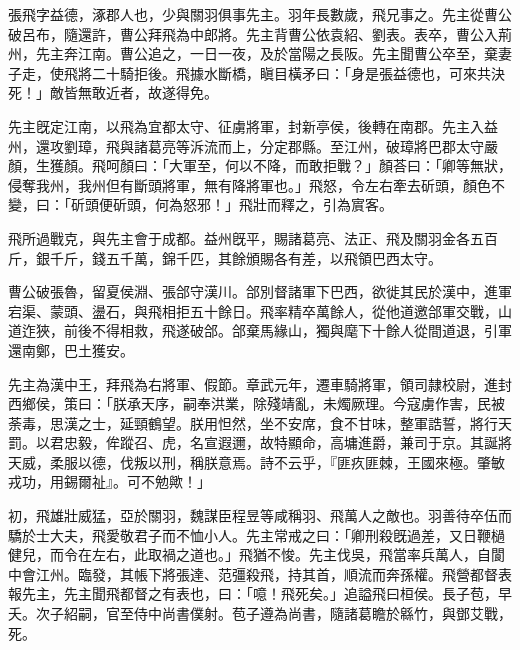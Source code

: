 \begin{pinyinscope}
 
 
 張飛字益德，涿郡人也，少與關羽俱事先主。羽年長數歲，飛兄事之。先主從曹公破呂布，隨還許，曹公拜飛為中郎將。先主背曹公依袁紹、劉表。表卒，曹公入荊州，先主奔江南。曹公追之，一日一夜，及於當陽之長阪。先主聞曹公卒至，棄妻子走，使飛將二十騎拒後。飛據水斷橋，瞋目橫矛曰：「身是張益德也，可來共決死！」敵皆無敢近者，故遂得免。
 
 
 
 
 先主旣定江南，以飛為宜都太守、征虜將軍，封新亭侯，後轉在南郡。先主入益州，還攻劉璋，飛與諸葛亮等泝流而上，分定郡縣。至江州，破璋將巴郡太守嚴顏，生獲顏。飛呵顏曰：「大軍至，何以不降，而敢拒戰？」顏荅曰：「卿等無狀，侵奪我州，我州但有斷頭將軍，無有降將軍也。」飛怒，令左右牽去斫頭，顏色不變，曰：「斫頭便斫頭，何為怒邪！」飛壯而釋之，引為賔客。
 
 
 飛所過戰克，與先主會于成都。益州旣平，賜諸葛亮、法正、飛及關羽金各五百斤，銀千斤，錢五千萬，錦千匹，其餘頒賜各有差，以飛領巴西太守。
 
 
 
 
 曹公破張魯，留夏侯淵、張郃守漢川。郃別督諸軍下巴西，欲徙其民於漢中，進軍宕渠、蒙頭、盪石，與飛相拒五十餘日。飛率精卒萬餘人，從他道邀郃軍交戰，山道迮狹，前後不得相救，飛遂破郃。郃棄馬緣山，獨與麾下十餘人從間道退，引軍還南鄭，巴土獲安。
 
 
 
 
 先主為漢中王，拜飛為右將軍、假節。章武元年，遷車騎將軍，領司隷校尉，進封西鄉侯，策曰：「朕承天序，嗣奉洪業，除殘靖亂，未燭厥理。今寇虜作害，民被荼毒，思漢之士，延頸鶴望。朕用怛然，坐不安席，食不甘味，整軍誥誓，將行天罰。以君忠毅，侔蹤召、虎，名宣遐邇，故特顯命，高墉進爵，兼司于京。其誕將天威，柔服以德，伐叛以刑，稱朕意焉。詩不云乎，『匪疚匪棘，王國來極。肇敏戎功，用錫爾祉』。可不勉歟！」
 
 
 
 
 初，飛雄壯威猛，亞於關羽，魏謀臣程昱等咸稱羽、飛萬人之敵也。羽善待卒伍而驕於士大夫，飛愛敬君子而不恤小人。先主常戒之曰：「卿刑殺旣過差，又日鞭檛健兒，而令在左右，此取禍之道也。」飛猶不悛。先主伐吳，飛當率兵萬人，自閬中會江州。臨發，其帳下將張達、范彊殺飛，持其首，順流而奔孫權。飛營都督表報先主，先主聞飛都督之有表也，曰：「噫！飛死矣。」追謚飛曰桓侯。長子苞，早夭。次子紹嗣，官至侍中尚書僕射。苞子遵為尚書，隨諸葛瞻於緜竹，與鄧艾戰，死。
 
 
\end{pinyinscope}